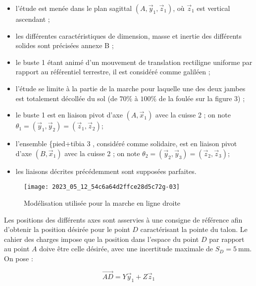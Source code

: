 \begin{itemize}
  \item l'étude est menée dans le plan sagittal $\left(A, \vec{y}_{1}, \vec{z}_{1}\right)$, où $\vec{z}_{1}$ est vertical ascendant ;
  \item les différentes caractéristiques de dimension, masse et inertie des différents solides sont précisées annexe B ;
  \item le buste 1 étant animé d'un mouvement de translation rectiligne uniforme par rapport au référentiel terrestre, il est considéré comme galiléen ;
  \item l'étude se limite à la partie de la marche pour laquelle une des deux jambes est totalement décollée du sol (de $70 \%$ à $100 \%$ de la foulée sur la figure 3) ;
  \item le buste 1 est en liaison pivot d'axe $\left(A, \vec{x}_{1}\right)$ avec la cuisse 2 ; on note $\theta_{1}=\left(\vec{y}_{1}, \vec{y}_{2}\right)=\left(\vec{z}_{1}, \vec{z}_{2}\right)$;
  \item l'ensemble \{pied+tibia 3 , considéré comme solidaire, est en liaison pivot d'axe $\left(B, \vec{x}_{1}\right)$ avec la cuisse 2 ; on note $\theta_{2}=\left(\vec{y}_{2}, \vec{y}_{3}\right)=\left(\vec{z}_{2}, \vec{z}_{3}\right)$;
  \item les liaisons décrites précédemment sont supposées parfaites.
\end{itemize}

\begin{figure}[!h]
\centering
\texttt{[image: 2023\_05\_12\_54c6a64d2ffce28d5c72g-03]}
\caption{Modélisation utilisée pour la marche en ligne droite \label{ccs_psi_2023_fig_04}}
\end{figure}


Les positions des différents axes sont asservies à une consigne de référence afin d'obtenir la position désirée pour le point $D$ caractérisant la pointe du talon. Le cahier des charges impose que la position dans l'espace du point $D$ par rapport au point $A$ doive être celle désirée, avec une incertitude maximale de $S_{D}=5 \mathrm{~mm}$. On pose :

$$
\overrightarrow{A D}=Y \vec{y}_{1}+Z \vec{z}_{1}
$$

\ifprof
\begin{corrige}
\end{corrige}
\else
\fi

